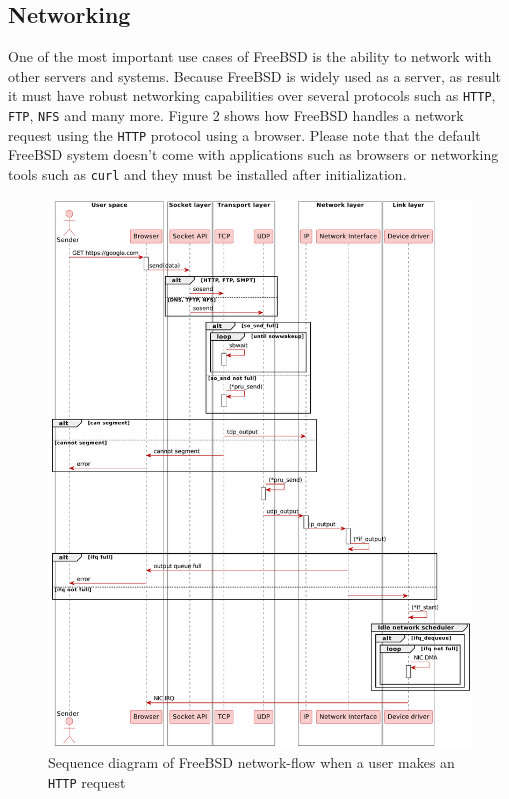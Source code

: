 \documentclass[12pt, dvipsnames, a4paper]{article}
\newcommand{\code}[1]{\texttt{#1}}
\begin{document}
\subsection{Networking}
One of the most important use cases of FreeBSD is the ability to network with other servers and systems. Because FreeBSD is
widely used as a server, as result it must have robust networking capabilities over several protocols such as \code{HTTP}, \code{FTP}, \code{NFS} and many more.
Figure 2 shows how FreeBSD handles a network request using the \code{HTTP} protocol using a browser. Please note that the default FreeBSD system
doesn't come with applications such as browsers or networking tools such as \code{curl} and they must be installed after initialization.

\begin{figure}[!htb]
	\advance\leftskip-0.5cm
	\includegraphics[width = 570pt]{assets/sequence_diagrams/network-send-flow.pdf}
	\caption{Sequence diagram of FreeBSD network-flow when a user makes an \code{HTTP} request}
\end{figure}
\clearpage
\end{document}
